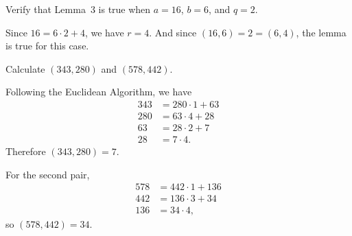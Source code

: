  Verify that Lemma~3 is true when $a = 16$, $b = 6$, and
$q = 2$.
\begin{solution}
  Since $16 = 6\cdot2 + 4$, we have $r = 4$. And since
  $(16,6) = 2 = (6,4)$, the lemma is true for this case.
\end{solution}

 Calculate $(343, 280)$ and $(578, 442)$.
\begin{solution}
  Following the Euclidean Algorithm, we have
  \begin{align*}
    343 &= 280\cdot1 + 63 \\
    280 &= 63\cdot4 + 28 \\
    63 &= 28\cdot2 + 7 \\
    28 &= 7\cdot4.
  \end{align*}
  Therefore $(343, 280) = 7$.

  For the second pair,
  \begin{align*}
    578 &= 442\cdot1 + 136 \\
    442 &= 136\cdot3 + 34 \\
    136 &= 34\cdot4,
  \end{align*}
  so $(578,442) = 34$.
\end{solution}
